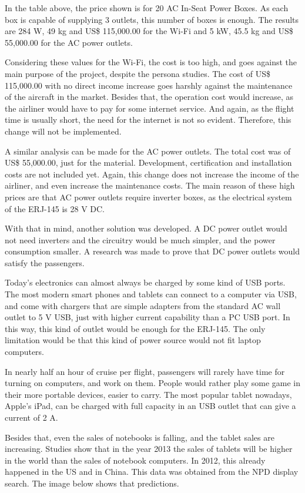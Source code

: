 In the table above, the price shown is for 20 AC In-Seat Power Boxes. As each box is capable of supplying 3 outlets, this number of boxes is enough. The results are 284 W, 49 kg and US\$ 115,000.00 for the Wi-Fi and 5 kW, 45.5 kg and US\$ 55,000.00 for the AC power outlets.

Considering these values for the Wi-Fi, the cost is too high, and goes against the main purpose of the project, despite the persona studies. The cost of US\$ 115,000.00 with no direct income increase goes harshly against the maintenance of the aircraft in the market. Besides that, the operation cost would increase, as the airliner would have to pay for some internet service. And again, as the flight time is usually short, the need for the internet is not so evident. Therefore, this change will not be implemented.

A similar analysis can be made for the AC power outlets. The total cost was of  US\$ 55,000.00, just for the material. Development, certification and installation costs are not included yet. Again, this change does not increase the income of the airliner, and even increase the maintenance costs. The main reason of these high prices are that AC power outlets require inverter boxes, as the electrical system of the ERJ-145 is 28 V DC.

With that in mind, another solution was developed. A DC power outlet would not need inverters and the circuitry would be much simpler, and the power consumption smaller. A research was made to prove that DC power outlets would satisfy the passengers.

Today's electronics can almost always be charged by some kind of USB ports. The most modern smart phones and tablets can connect to a computer via USB, and come with chargers that are simple adapters from the standard AC wall outlet to 5 V USB, just with higher current capability than a PC USB port. In this way, this kind of outlet would be enough for the ERJ-145. The only limitation would be that this kind of power source would not fit laptop computers.

In nearly half an hour of cruise per flight, passengers will rarely have time for turning on computers, and work on them. People would rather play some game in their more portable devices, easier to carry. The most popular tablet nowadays, Apple's iPad, can be charged with full capacity in an USB outlet that can give a current of 2 A.

Besides that, even the sales of notebooks is falling, and the tablet sales are increasing. Studies show that in the year 2013 the sales of tablets will be higher in the world than the sales of notebook computers. In 2012, this already happened in the US and in China. This data was obtained from the NPD display search. The image below shows that predictions.

